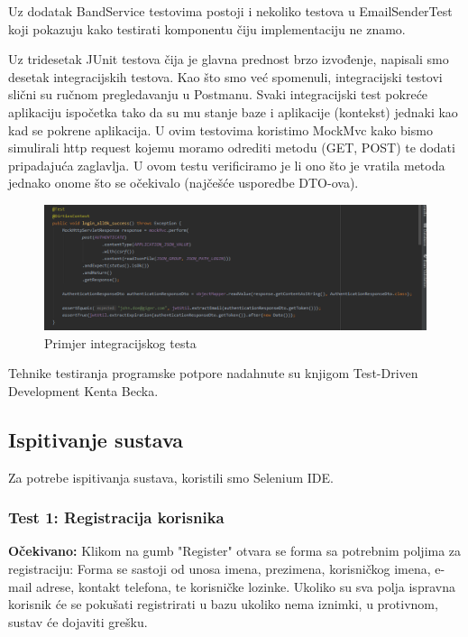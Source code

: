 			Uz dodatak BandService testovima postoji i nekoliko testova u EmailSenderTest koji pokazuju kako testirati komponentu čiju implementaciju ne znamo.
			
			
			Uz tridesetak JUnit testova čija je glavna prednost brzo izvođenje, napisali smo desetak integracijskih testova. Kao što smo već spomenuli, integracijski testovi slični su ručnom pregledavanju u Postmanu. Svaki integracijski test pokreće aplikaciju ispočetka tako da su mu stanje baze i aplikacije (kontekst) jednaki kao kad se pokrene aplikacija. U ovim testovima koristimo MockMvc kako bismo simulirali http request kojemu moramo odrediti metodu (GET, POST) te dodati pripadajuća zaglavlja. U ovom testu verificiramo je li ono što je vratila metoda jednako onome što se očekivalo (najčešće usporedbe DTO-ova).
			
			\begin{figure}[H]
				\begin{center}
					\includegraphics[width=17cm]{slike/integracijski_test.PNG}
				\end{center}
				\caption{Primjer integracijskog testa}
				\label{fig:inttest}
			\end{figure}
			
			Tehnike testiranja programske potpore nadahnute su knjigom Test-Driven Development Kenta Becka.
			
			
			
			\subsection{Ispitivanje sustava}
			
			 
		 	Za potrebe ispitivanja sustava, koristili smo Selenium IDE.
		 	
		 	\subsubsection{Test 1: Registracija korisnika}
		 		
		 		\textbf{Očekivano:} Klikom na gumb "Register" otvara se forma sa potrebnim poljima za registraciju: Forma se sastoji od unosa imena, prezimena, korisničkog imena, e-mail adrese, kontakt telefona, te korisničke lozinke. Ukoliko su sva polja ispravna korisnik će se pokušati registrirati u bazu ukoliko nema iznimki, u protivnom, sustav će dojaviti grešku.
		 		
